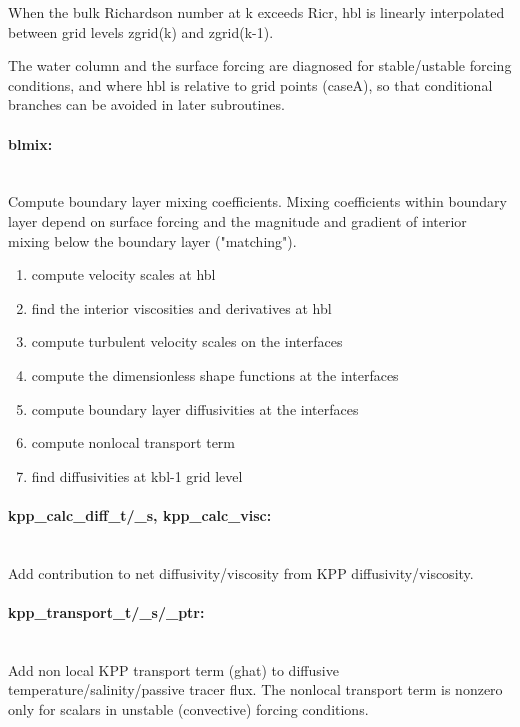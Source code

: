 When the bulk Richardson number at k exceeds Ricr, hbl is
linearly interpolated between grid levels zgrid(k) and zgrid(k-1).

The water column and the surface forcing are diagnosed for
stable/ustable forcing conditions, and where hbl is relative
to grid points (caseA), so that conditional branches can be
avoided in later subroutines.

\paragraph{blmix:} ~ \\
%
Compute boundary layer mixing coefficients.
Mixing coefficients within boundary layer depend on surface
forcing and the magnitude and gradient of interior mixing below
the boundary layer ("matching").
%
\begin{enumerate}
%
\item
compute velocity scales at hbl
%
\item
find the interior viscosities and derivatives at hbl
%
\item
compute turbulent velocity scales on the interfaces
%
\item
compute the dimensionless shape functions at the interfaces
%
\item
compute boundary layer diffusivities at the interfaces
%
\item
compute nonlocal transport term
%
\item
find diffusivities at kbl-1 grid level
%
\end{enumerate}

\paragraph{kpp\_calc\_diff\_t/\_s, kpp\_calc\_visc:} ~  \\
%
Add contribution to net diffusivity/viscosity from 
KPP diffusivity/viscosity.

\paragraph{kpp\_transport\_t/\_s/\_ptr:} ~ \\
%
Add non local KPP transport term (ghat) to diffusive
temperature/salinity/passive tracer flux.
The nonlocal transport term is nonzero only for scalars
in unstable (convective) forcing conditions. 

